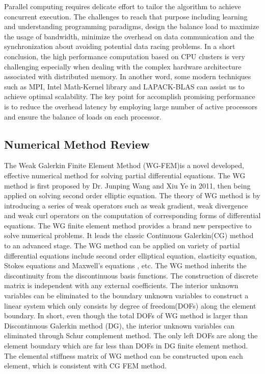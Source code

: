 Parallel computing requires delicate effort to tailor the algorithm to achieve concurrent execution. The challenges to reach that purpose including learning and understanding programming paradigms, design the balance load to maximize the usage of bandwidth, minimize the overhead on data communication and the synchronization about avoiding potential data racing problems. In a short conclusion, the high performance computation based on CPU clusters is very challenging especially when dealing with the complex hardware architecture associated with distributed memory. In another word, some modern techniques such as MPI, Intel Math-Kernel library and LAPACK-BLAS can assist us to achieve optimal scalability. The key point for accomplish promising performance is to reduce the overhead latency by employing large number of active processors and ensure the balance of loads on each processor.

\subsection{Numerical Method Review}

The Weak Galerkin Finite Element Method (WG-FEM)is a novel developed, effective numerical method for solving partial differential equations. The WG method is first proposed by Dr. Junping Wang and Xiu Ye in 2011, then being applied on solving second order elliptic equation\cite{wang2014weak}. The theory of WG method is by introducing a series of weak operators such as weak gradient, weak divergence and weak curl operators on the computation of corresponding forms of differential equations. The WG finite element method provides a  brand new perspective to solve numerical problems. It leads the classic Continuous Galerkin(CG) method to an advanced stage. The WG method can be applied on variety of partial differential equations include second order elliptical equation, elasticity equation\cite{wang2016locking}, Stokes equations \cite{wang2016weak} and Maxwell's equations \cite{mu2013weak}, etc. The WG method inherits the discontinuity from the discontinuous basis functions. The construction of discrete matrix is independent with any external coefficients. The interior unknown variables can be eliminated to the boundary unknown variables to construct a linear system which only consists by degree of freedom(DOFs) along the element boundary. In short, even though the total DOFs of WG method is larger than Discontinuous Galerkin method (DG), the interior unknown variables can eliminated through Schur complement method. The only left DOFs are along the element boundary which are far less than DOFs in DG finite element method. The elemental stiffness matrix of WG method can be constructed upon each element, which is consistent with CG FEM method. 

